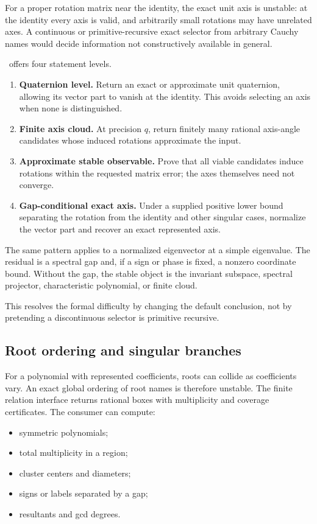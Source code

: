 For a proper rotation matrix near the identity, the exact unit axis is unstable: at the identity every axis is valid, and arbitrarily small rotations may have unrelated axes.  A continuous or primitive-recursive exact selector from arbitrary Cauchy names would decide information not constructively available in general.

\CIFER\ offers four statement levels.

\begin{enumerate}
\item \textbf{Quaternion level.}  Return an exact or approximate unit quaternion, allowing its vector part to vanish at the identity.  This avoids selecting an axis when none is distinguished.
\item \textbf{Finite axis cloud.}  At precision \(q\), return finitely many rational axis-angle candidates whose induced rotations approximate the input.
\item \textbf{Approximate stable observable.}  Prove that all viable candidates induce rotations within the requested matrix error; the axes themselves need not converge.
\item \textbf{Gap-conditional exact axis.}  Under a supplied positive lower bound separating the rotation from the identity and other singular cases, normalize the vector part and recover an exact represented axis.
\end{enumerate}

The same pattern applies to a normalized eigenvector at a simple eigenvalue.  The residual is a spectral gap and, if a sign or phase is fixed, a nonzero coordinate bound.  Without the gap, the stable object is the invariant subspace, spectral projector, characteristic polynomial, or finite cloud.

This resolves the formal difficulty by changing the default conclusion, not by pretending a discontinuous selector is primitive recursive.

\subsection{Root ordering and singular branches}

For a polynomial with represented coefficients, roots can collide as coefficients vary.  An exact global ordering of root names is therefore unstable.  The finite relation interface returns rational boxes with multiplicity and coverage certificates.  The consumer can compute:

\begin{itemize}
\item symmetric polynomials;
\item total multiplicity in a region;
\item cluster centers and diameters;
\item signs or labels separated by a gap;
\item resultants and gcd degrees.
\end{itemize}

